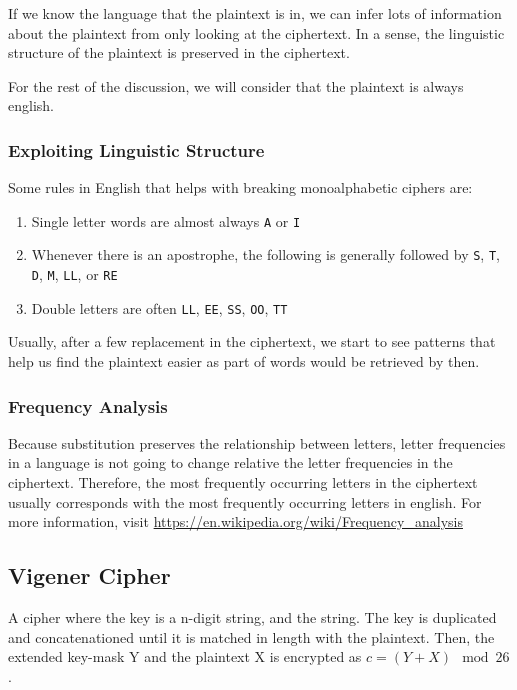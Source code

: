 \documentclass{article}
\begin{document}
\begin{multicols}{2}
If we know the language that the plaintext is in, we can infer lots of information about the plaintext from only looking at the ciphertext. In a sense, the linguistic structure of the plaintext is preserved in the ciphertext.

For the rest of the discussion, we will consider that the plaintext is always english.

\subsubsection{Exploiting Linguistic Structure}

Some rules in English that helps with breaking monoalphabetic ciphers are:

\begin{enumerate}
    \item Single letter words are almost always \texttt{A} or \texttt{I}
    \item Whenever there is an apostrophe, the following is generally followed by \texttt{S}, \texttt{T}, \texttt{D}, \texttt{M}, \texttt{LL}, or \texttt{RE}
    \item Double letters are often \texttt{LL}, \texttt{EE}, \texttt{SS}, \texttt{OO}, \texttt{TT}
\end{enumerate}

Usually, after a few replacement in the ciphertext, we start to see patterns that help us find the plaintext easier as part of words would be retrieved by then.

\subsubsection{Frequency Analysis}

Because substitution preserves the relationship between letters, letter frequencies in a language is not going to change relative the letter frequencies in the ciphertext. Therefore, the most frequently occurring letters in the ciphertext usually corresponds with the most frequently occurring letters in english. For more information, visit \url{https://en.wikipedia.org/wiki/Frequency_analysis}

\subsection{Vigener Cipher}

A cipher where the key is a n-digit string, and the string. The key is duplicated and concatenationed until it is matched in length with the plaintext. Then, the extended key-mask Y and the plaintext X is encrypted as $c = (Y + X) \mod 26$.


\end{multicols}
\end{document}
